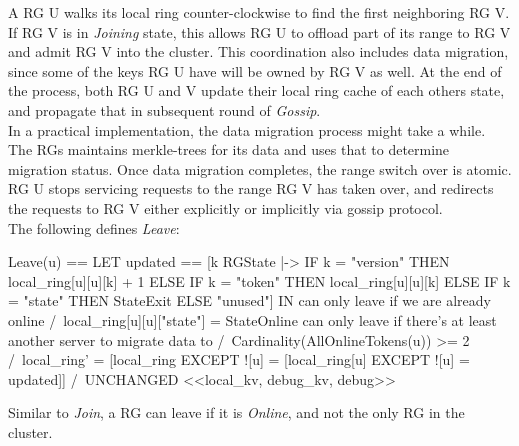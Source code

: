 A RG U walks its local ring counter-clockwise to find the first neighboring RG
V. If RG V is in \textit{Joining} state, this allows RG U to offload part of
its range to RG V and admit RG V into the cluster. This coordination also
includes data migration, since some of the keys RG U have will be owned by RG V
as well. At the end of the process, both RG U and V update their local ring cache of
each others state, and propagate that in subsequent round of \textit{Gossip}.\\

In a practical implementation, the data migration process might take a while.
The RGs maintains merkle-trees for its data and uses that to determine
migration status. Once data migration completes, the range switch over is atomic. 
RG U stops servicing requests to the range RG V has taken over, and redirects 
the requests to RG V either explicitly or implicitly via gossip protocol.\\

The following defines \textit{Leave}:\\

\begin{tla}
Leave(u) == 
    LET 
        updated == [k \in RGState |-> 
                     IF k = "version" THEN local_ring[u][u][k] + 1
                     ELSE IF k = "token" THEN local_ring[u][u][k]
                     ELSE IF k = "state" THEN StateExit
                     ELSE "unused"]
    IN 
        \* can only leave if we are already online 
        /\ local_ring[u][u]["state"] = StateOnline
        \* can only leave if there's at least another server to migrate data to
        /\ Cardinality(AllOnlineTokens(u)) >= 2
        /\ local_ring' = [local_ring EXCEPT ![u] 
                            = [local_ring[u] EXCEPT ![u]
                                = updated]] 
        /\ UNCHANGED <<local_kv, debug_kv, debug>>
\end{tla}
\begin{tlatex}
%
%
\@x{\@s{32.8} updated \.{\defeq} [ k \.{\in} RGState \.{\mapsto}}%
%
\@x{\@s{36.89} \.{\ELSE}\@w{unused} ]}%
%
%
%
\@xx{}%
%
%
\@xx{}%
%
 \@x{\@s{32.8} \.{\land} local\_ring \.{'} \.{=} [ local\_ring {\EXCEPT}
 {\bang} [ u ]}%
\@x{\@s{41.0} \.{=} [ local\_ring [ u ] {\EXCEPT} {\bang} [ u ]}%
\@x{\@s{45.1} \.{=} updated ] ]}%
\end{tlatex}

Similar to \textit{Join}, a RG can leave if it is \textit{Online}, and not the
only RG in the cluster.


% 
